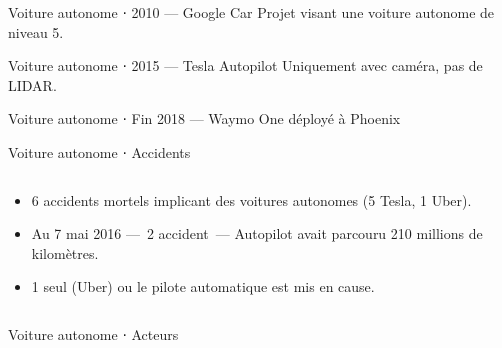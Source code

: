 \begin{frame}{Voiture autonome ⋅ 2010 --- Google Car}
  Projet visant une voiture autonome de niveau 5.

\end{frame}

\begin{frame}{Voiture autonome ⋅ 2015 --- Tesla Autopilot}
  Uniquement avec caméra, pas de LIDAR.

\end{frame}

\begin{frame}{Voiture autonome ⋅ Fin 2018 --- Waymo One déployé à Phoenix}
\end{frame}

\begin{frame}{Voiture autonome ⋅ Accidents}
  \begin{columns}
    \begin{column}{0.6\textwidth}
      \begin{itemize}
        \item 6 accidents mortels implicant des voitures autonomes (5 Tesla, 1 Uber).
        \item Au 7 mai 2016 ---~2\ieme{} accident~--- Autopilot avait parcouru 210 millions de kilomètres.
        \item 1 seul (Uber) ou le pilote automatique est mis en cause.
      \end{itemize}
    \end{column}
    \begin{column}{0.4\textwidth}
    \end{column}
  \end{columns}
\end{frame}

\begin{frame}{Voiture autonome ⋅ Acteurs}
\end{frame}

